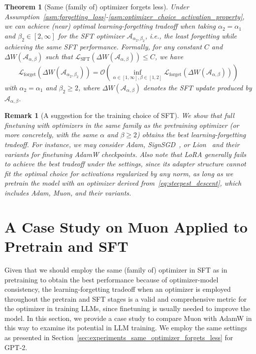 \documentclass{article}
\newtheorem{theorem}{Theorem}
\newtheorem{remark}{Remark}
\theoremstyle{remark}
\newcommand{\cO}{\mathcal{O}}
\newcommand{\cA}{\mathcal{A}}
\newcommand{\Lforget}{\mathcal{L}_{\mathrm{forget}}}
\newcommand{\Lsft}{\mathcal{L}_{\mathrm{SFT}}}
\begin{document}
\begin{theorem}[Same (family of) optimizer forgets less]\label{thm:same_opt_forgets_less}
    Under Assumption~\ref{asm:forgetting_loss}-\ref{asm:optimizer_choice_activation_property}, we can achieve (near) optimal learning-forgetting tradeoff when taking $\alpha_2 = \alpha_1$ and $\beta_2 \in [2,\infty]$ for the SFT optimizer $\cA_{\alpha_2,\beta_2}$, i.e., the least forgetting while achieving the same SFT performance. Formally, for any constant $C$ and $\Delta W (\cA_{\alpha,\beta})$ such that $\Lsft(\Delta W(\cA_{\alpha,\beta})) \le C$, we have
        \begin{align*}
            \Lforget\left( \Delta W(\cA_{\alpha_2,\beta_2}) \right) = \cO\left( \inf_{\alpha\in [1,\infty] , \beta \in[1,2] } \Lforget\left( \Delta W(\cA_{\alpha,\beta}) \right) \right)
        \end{align*}
    with $\alpha_2 = \alpha_1$ and $\beta_2 \ge 2$, where $\Delta W (\cA_{\alpha,\beta})$ denotes the SFT update produced by $\cA_{\alpha,\beta}$.
\end{theorem}

    

\begin{remark}[A suggestion for the training choice of SFT]
    We show that full finetuning with optimizers in the same family as the pretraining optimizer (or more concretely, with the same $\alpha$ and $\beta \ge 2$) obtains the best learning-forgetting tradeoff. For instance, we may consider Adam, SignSGD~\citep{bernstein2018signsgd}, or Lion~\citep{chen2023symbolic} and their variants for finetuning AdamW checkpoints. 
    Also note that LoRA generally fails to achieve the best tradeoff under the settings, since its adapter structure cannot fit the optimal choice for activations regularized by any norm, as long as we pretrain the model with an optimizer derived from~\eqref{eq:steepest_descent}, which includes Adam, Muon, and their variants.
\end{remark}










\section{A Case Study on Muon Applied to Pretrain and SFT}\label{sec:muon_better_memorization}

Given that we should employ the same (family of) optimizer in SFT as in pretraining to obtain the best performance because of optimizer-model consistency, the learning-forgetting tradeoff when an optimizer is employed throughout the pretrain and SFT stages is a valid and comprehensive metric for the optimizer in training LLMs, since finetuning is usually needed to improve the model.
In this section, we provide a case study to compare Muon with AdamW in this way to examine its potential in LLM training. We employ the same settings as presented in Section~\ref{sec:experiments_same_optimizer_forgets_less} for GPT-2.
\end{document}

